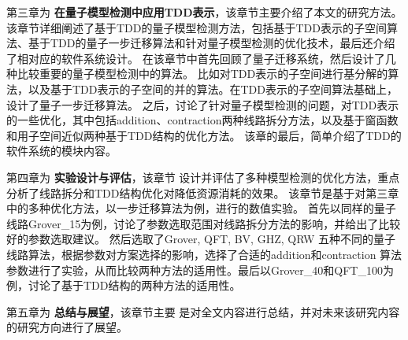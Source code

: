 第三章为 \textbf{在量子模型检测中应用TDD表示}，该章节主要介绍了本文的研究方法。
该章节详细阐述了基于TDD的量子模型检测方法，包括基于TDD表示的子空间算法、基于TDD的量子一步迁移算法和针对量子模型检测的优化技术，最后还介绍了相对应的软件系统设计。
在该章节中首先回顾了量子迁移系统，然后设计了几种比较重要的量子模型检测中的算法。
比如对TDD表示的子空间进行基分解的算法，以及基于TDD表示的子空间的并的算法。在TDD表示的子空间算法基础上，设计了量子一步迁移算法。
之后，讨论了针对量子模型检测的问题，对TDD表示的一些优化，其中包括addition、contraction两种线路拆分方法，以及基于窗函数和用子空间近似两种基于TDD结构的优化方法。
该章的最后，简单介绍了TDD的软件系统的模块内容。

第四章为 \textbf{实验设计与评估}，该章节
设计并评估了多种模型检测的优化方法，重点分析了线路拆分和TDD结构优化对降低资源消耗的效果。
该章节是基于对第三章中的多种优化方法，以一步迁移算法为例，进行的数值实验。
首先以同样的量子线路Grover\_15为例，讨论了参数选取范围对线路拆分方法的影响，并给出了比较好的参数选取建议。
然后选取了Grover, QFT, BV, GHZ, QRW
五种不同的量子线路算法，根据参数对方案选择的影响，选择了合适的addition和contraction
算法参数进行了实验，从而比较两种方法的适用性。最后以Grover\_40和QFT\_100为例，讨论了基于TDD结构的两种方法的适用性。

第五章为 \textbf{总结与展望}，该章节主要
是对全文内容进行总结，并对未来该研究内容的研究方向进行了展望。